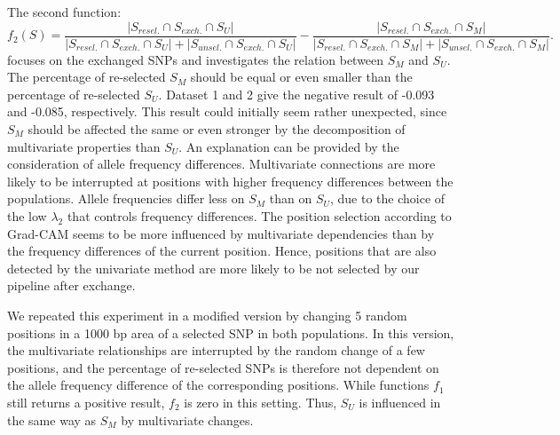 \documentclass{article}
\begin{document}
The second function:
\begin{equation*}
f_{2}(S)=\frac{|S_{resel.}\cap S_{exch.}\cap S_{U}|}{|S_{resel.}\cap S_{exch.}\cap S_{U}|+|S_{unsel.}\cap S_{exch.}\cap S_{U}|}-\frac{|S_{resel.}\cap S_{exch.}\cap S_{M}|}{|S_{resel.}\cap S_{exch.}\cap S_{M}|+|S_{unsel.}\cap S_{exch.}\cap S_{M}|}.
\end{equation*}
focuses on the exchanged SNPs and investigates the relation between $S_{M}$ 
and $S_{U}$.
The percentage of re-selected $S_{M}$ should be equal or even smaller than the percentage of re-selected $S_{U}$. %
Dataset 1 and 2 give the negative result of -0.093 and -0.085, respectively. 
This result could initially seem rather unexpected, since $S_{M}$ should be affected the same or even stronger by the decomposition of multivariate properties than $S_{U}$.
An explanation can be provided by the consideration of allele frequency differences.
Multivariate connections are more likely to be interrupted at positions with higher frequency differences between the populations. Allele frequencies differ less on $S_{M}$ than on $S_{U}$, due to the choice of the low $\lambda_{2}$ that controls frequency differences. The position selection according to Grad-CAM seems to be more influenced by multivariate dependencies than by the frequency differences of the current position. Hence, positions that are also detected by the univariate method are more likely to be not selected by our pipeline after exchange.

We repeated this experiment in a modified version by changing 5 random positions in a 1000 bp area of a selected SNP in both populations.
In this version, the multivariate relationships are interrupted by the random change of a few positions, and the percentage of re-selected SNPs is therefore not dependent on the allele frequency difference of the corresponding positions.
While functions $f_{1}$ still returns a positive result, $f_{2}$ is zero in this setting. Thus,  $S_{U}$ is influenced in the same way as $S_{M}$ by multivariate changes.
\end{document}
